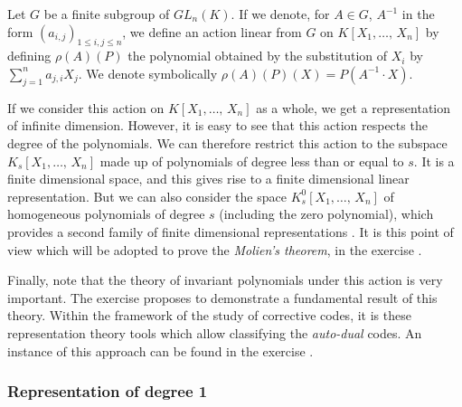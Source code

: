  
 
 
\begin{defn}
 Let $G$ be a finite subgroup of $ GL_n (K) $. If we denote, for $ A \in G $, $ A^{-1} $ in the form $ (a_{i, j})_{1 \leq i, j \leq n} $, we define an action linear from $G$ on $ K[X_1, \ldots, \, X_n] $ by defining $ \rho (A) (P) $ the polynomial obtained by the substitution of $ X_i $ by $ \sum_{j = 1}^{n}{a_{j, i} X_j} $. We denote symbolically $ \rho (A) (P) (X) = P (A^{-1} \cdot X) $.
\end{defn}
If we consider this action on $ K[X_1, \ldots, \, X_n] $ as a whole, we get a representation of infinite dimension. However, it is easy to see that this action respects the degree of the polynomials. We can therefore restrict this action to the subspace $ K_s [X_1, \ldots, \, X_n] $ made up of polynomials of degree less than or equal to $ s $. It is a finite dimensional space, and this gives rise to a finite dimensional linear representation. But we can also consider the space $ K_s^0 [X_1, \ldots, \, X_n] $ of homogeneous polynomials of degree $ s $ (including the zero polynomial), which provides a second family of finite dimensional representations . It is this point of view which will be adopted to prove the \textit{Molien's theorem}, in the exercise .
 
 
Finally, note that the theory of invariant polynomials under this action is very important. The exercise  proposes to demonstrate a fundamental result of this theory. Within the framework of the study of corrective codes, it is these representation theory tools which allow classifying the \textit{auto-dual} codes. An instance of this approach can be found in the exercise .
\subsubsection{Representation of degree 1}
\label{sect3-representation-degre-1}
 
